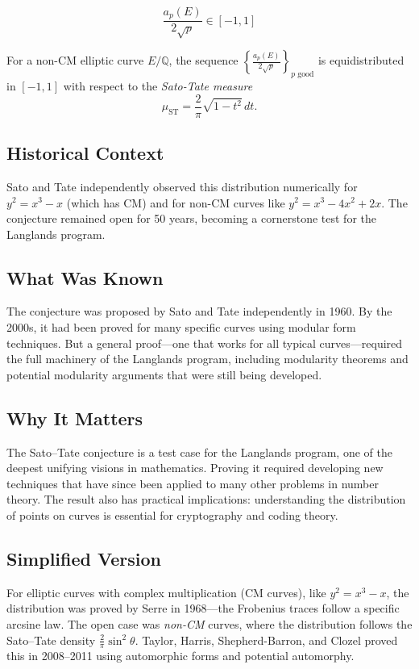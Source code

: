 \begin{equation}
\frac{a_p(E)}{2\sqrt{p}} \in [-1, 1]
\end{equation}

\begin{conjecture}
For a non-CM elliptic curve $E/\mathbb{Q}$, the sequence $\left\{ \frac{a_p(E)}{2\sqrt{p}} \right\}_{p \text{ good}}$ is equidistributed in $[-1, 1]$ with respect to the \emph{Sato-Tate measure}
\[
\mu_{\text{ST}} = \frac{2}{\pi} \sqrt{1 - t^2} \, dt.
\]
\end{conjecture}

\subsection{Historical Context}
Sato and Tate independently observed this distribution numerically for $y^2 = x^3 - x$ (which has CM) and for non-CM curves like $y^2 = x^3 - 4x^2 + 2x$. The conjecture remained open for 50 years, becoming a cornerstone test for the Langlands program.

\subsection{What Was Known}
The conjecture was proposed by Sato and Tate independently in 1960. By the 2000s, it had been proved for many specific curves using modular form techniques. But a general proof---one that works for all typical curves---required the full machinery of the Langlands program, including modularity theorems and potential modularity arguments that were still being developed.

\subsection{Why It Matters}
The Sato--Tate conjecture is a test case for the Langlands program, one of the deepest unifying visions in mathematics. Proving it required developing new techniques that have since been applied to many other problems in number theory. The result also has practical implications: understanding the distribution of points on curves is essential for cryptography and coding theory.

\subsection{Simplified Version}
For elliptic curves with complex multiplication (CM curves), like $y^2 = x^3 - x$, the distribution was proved by Serre in 1968---the Frobenius traces follow a specific arcsine law. The open case was \emph{non-CM} curves, where the distribution follows the Sato--Tate density $\frac{2}{\pi}\sin^2\theta$. Taylor, Harris, Shepherd-Barron, and Clozel proved this in 2008--2011 using automorphic forms and potential automorphy.

